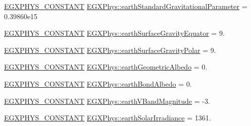 \begin{DoxyCompactItemize}
\item 
\mbox{\hyperlink{group___e_g_x_phys-_constants-_macros_ga76980d288494ce1714c9ac68a95ba702}{E\+G\+X\+P\+H\+Y\+S\+\_\+\+C\+O\+N\+S\+T\+A\+NT}} \mbox{\hyperlink{group___e_g_x_phys-_constants-_astrophysics-_solar_system-_earth-_bulk_gaaabe1a1d2cea41e00fb1646a25d9eafe}{E\+G\+X\+Phys\+::earth\+Standard\+Gravitational\+Parameter}} = 0.\+39860e15
\item 
\mbox{\hyperlink{group___e_g_x_phys-_constants-_macros_ga76980d288494ce1714c9ac68a95ba702}{E\+G\+X\+P\+H\+Y\+S\+\_\+\+C\+O\+N\+S\+T\+A\+NT}} \mbox{\hyperlink{group___e_g_x_phys-_constants-_astrophysics-_solar_system-_earth-_bulk_ga16734192d073e46f32dc0e296b2f99a6}{E\+G\+X\+Phys\+::earth\+Surface\+Gravity\+Equator}} = 9.
\item 
\mbox{\hyperlink{group___e_g_x_phys-_constants-_macros_ga76980d288494ce1714c9ac68a95ba702}{E\+G\+X\+P\+H\+Y\+S\+\_\+\+C\+O\+N\+S\+T\+A\+NT}} \mbox{\hyperlink{group___e_g_x_phys-_constants-_astrophysics-_solar_system-_earth-_bulk_ga874fc1db4f316a31102432881fd60ab3}{E\+G\+X\+Phys\+::earth\+Surface\+Gravity\+Polar}} = 9.
\item 
\mbox{\hyperlink{group___e_g_x_phys-_constants-_macros_ga76980d288494ce1714c9ac68a95ba702}{E\+G\+X\+P\+H\+Y\+S\+\_\+\+C\+O\+N\+S\+T\+A\+NT}} \mbox{\hyperlink{group___e_g_x_phys-_constants-_astrophysics-_solar_system-_earth-_bulk_ga4838765a5ca40d2cdde9691edd4ea45b}{E\+G\+X\+Phys\+::earth\+Geometric\+Albedo}} = 0.
\item 
\mbox{\hyperlink{group___e_g_x_phys-_constants-_macros_ga76980d288494ce1714c9ac68a95ba702}{E\+G\+X\+P\+H\+Y\+S\+\_\+\+C\+O\+N\+S\+T\+A\+NT}} \mbox{\hyperlink{group___e_g_x_phys-_constants-_astrophysics-_solar_system-_earth-_bulk_gad71c87a7e90df69eed292f9a54376fff}{E\+G\+X\+Phys\+::earth\+Bond\+Albedo}} = 0.
\item 
\mbox{\hyperlink{group___e_g_x_phys-_constants-_macros_ga76980d288494ce1714c9ac68a95ba702}{E\+G\+X\+P\+H\+Y\+S\+\_\+\+C\+O\+N\+S\+T\+A\+NT}} \mbox{\hyperlink{group___e_g_x_phys-_constants-_astrophysics-_solar_system-_earth-_bulk_ga184e55af75c87cafba30c63d054cb189}{E\+G\+X\+Phys\+::earth\+V\+Band\+Magnitude}} = -\/3.
\item 
\mbox{\hyperlink{group___e_g_x_phys-_constants-_macros_ga76980d288494ce1714c9ac68a95ba702}{E\+G\+X\+P\+H\+Y\+S\+\_\+\+C\+O\+N\+S\+T\+A\+NT}} \mbox{\hyperlink{group___e_g_x_phys-_constants-_astrophysics-_solar_system-_earth-_bulk_ga24723f27199b46aa1ad76d93bbe93b11}{E\+G\+X\+Phys\+::earth\+Solar\+Irradiance}} = 1361.

\end{DoxyCompactItemize}
